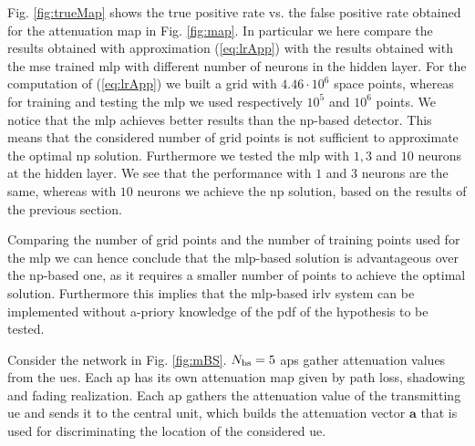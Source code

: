 \documentclass[draftcls,onecolumn,12pt]{IEEEtran}
\begin{document}
Fig. \ref{fig:trueMap} shows the true positive rate vs. the false positive rate obtained for the attenuation map in Fig. \ref{fig:map}. In particular we here compare the results obtained with approximation (\ref{eq:lrApp}) with the results obtained with the \ac{mse} trained \ac{mlp} with different number of neurons in the hidden layer.
For the computation of (\ref{eq:lrApp}) we built a grid with $4.46 \cdot 10^6$ space points, whereas for training and testing the \ac{mlp} we used respectively $10^5$ and $10^6$ points. We notice that the \ac{mlp} achieves better results than the \ac{np}-based detector. This means that the considered number of grid points is not sufficient to approximate the optimal \ac{np} solution. Furthermore we tested the \ac{mlp} with $1,3$ and $10$ neurons at the hidden layer. We see that the performance with $1$ and $3$ neurons are the same, whereas with $10$ neurons we achieve the \ac{np} solution, based on the results of the previous section. 

Comparing the number of grid points and the number of training points used for the \ac{mlp} we can hence conclude that the \ac{mlp}-based solution is advantageous over the \ac{np}-based one, as it requires a smaller number of points to achieve the optimal solution. Furthermore this implies that the \ac{mlp}-based \ac{irlv} system can be implemented without a-priory knowledge of the \ac{pdf} of the hypothesis to be tested.

Consider the network in Fig. \ref{fig:mBS}. $N_{\rm bs}=5$ \acp{ap} gather attenuation values from the \acp{ue}. Each \ac{ap} has its own attenuation map given by path loss, shadowing and fading realization. Each \ac{ap} gathers the attenuation value of the transmitting \ac{ue} and sends it to the central unit, which builds the attenuation vector $\bm{a}$ that is used for discriminating the location of the considered \ac{ue}.
\end{document}
